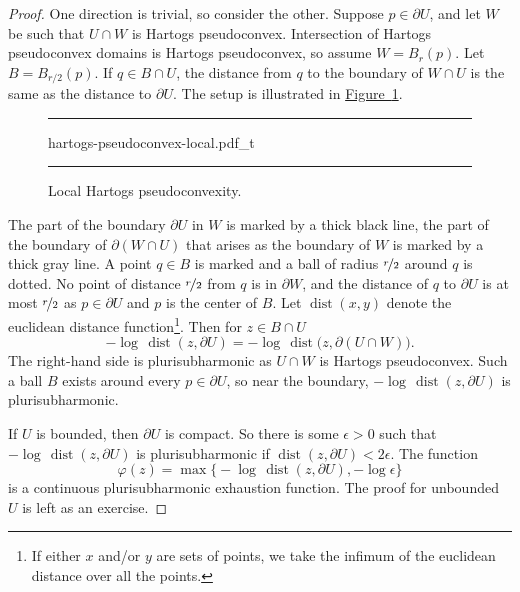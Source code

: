 \documentclass[12pt,openany]{book}
\theoremstyle{plain}
\theoremstyle{remark}
\theoremstyle{definition}
\newenvironment{myfig}{%
\begin{figure}[h!t]
\noindent\rule{\textwidth}{0.5pt}\vspace{12pt}\par\centering}%
{\par\noindent\rule{\textwidth}{0.5pt}
\end{figure}}
\theoremstyle{exercise}
\theoremstyle{example}
\newcommand{\figureref}[1]{\hyperref[#1]{Figure~\ref*{#1}}}
\begin{document}
\begin{proof}
One direction is trivial, so consider the other.
Suppose $p \in \partial U$, and let
$W$ be such that $U \cap W$
is Hartogs pseudoconvex.  Intersection of
Hartogs pseudoconvex domains is Hartogs pseudoconvex, so
assume $W = B_r(p)$.
Let $B = B_{r/2}(p)$.  If $q \in B \cap U$, the distance from $q$ to the boundary of $W \cap U$ is the same as
the distance to $\partial U$.  The setup is illustrated in
\figureref{fig:hartogs-pseudoconvex-local}.

\begin{myfig}
{hartogs-pseudoconvex-local.pdf_t}
\caption{Local Hartogs pseudoconvexity.\label{fig:hartogs-pseudoconvex-local}}
\end{myfig}

The part of the boundary $\partial U$ in $W$ is marked by a thick
black line, the part of the boundary of $\partial (W \cap U)$ that arises as
the boundary of $W$ is marked by a thick gray line.  A point $q \in B$ is
marked and a ball of radius $\nicefrac{r}{2}$ around $q$ is dotted.
No point of distance $\nicefrac{r}{2}$ from $q$ is in $\partial W$, and
the distance of $q$ to $\partial U$ is at most $\nicefrac{r}{2}$ as $p \in \partial U$
and $p$ is the center of $B$.
%
Let $\operatorname{dist}(x,y)$ denote the
euclidean distance function\footnote{If either $x$ and/or $y$ are sets
of points, we take the infimum of the euclidean distance over all the points.}.
Then for $z \in B \cap U$
\begin{equation*}
- \log \, \operatorname{dist}(z, \partial U) =
- \log \, \operatorname{dist}\bigl(z, \partial (U \cap W)\bigr).
\end{equation*}
The right-hand side is plurisubharmonic as $U \cap W$ is Hartogs
pseudoconvex.  Such a ball $B$ exists around every $p \in \partial U$, so near
the boundary, $- \log \, \operatorname{dist}(z, \partial U)$ is
plurisubharmonic.

If $U$ is bounded, then $\partial U$ is compact.  So there is some
$\epsilon > 0$ such that $- \log \, \operatorname{dist}(z, \partial U)$
is plurisubharmonic if $\operatorname{dist}(z, \partial U) < 2\epsilon$.
The function
\begin{equation*}
\varphi(z) = \max \bigl\{
- \log \, \operatorname{dist}(z, \partial U) , - \log \epsilon \bigr\}
\end{equation*}
is a continuous plurisubharmonic exhaustion function.
The proof for
unbounded $U$ is left as an exercise.
\end{proof}
\end{document}
